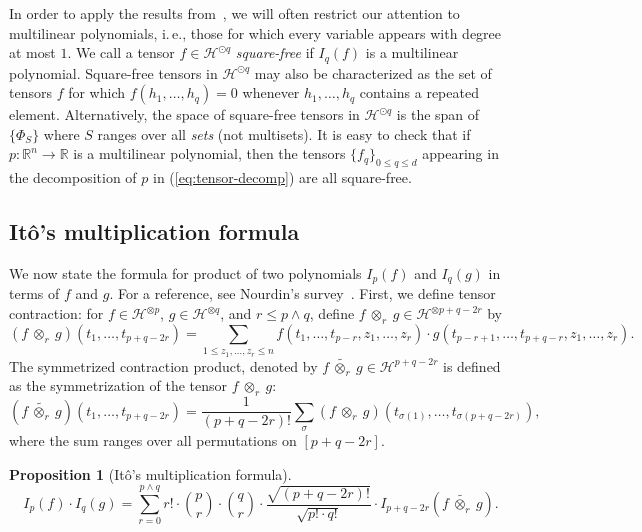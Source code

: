 \documentclass[11pt]{article}
\numberwithin{equation}{section}
\newtheorem{proposition}[theorem]{Proposition}
\theoremstyle{definition}
\theoremstyle{plain}
\newcommand{\ie}{i.\,e.}
\begin{document}
In order to apply the results from~\cite{DS14}, we will often restrict our
attention to multilinear polynomials, \ie, those for which every variable
appears with degree at most $1$. We call a tensor $f \in \mathcal{H}^{\odot q}$
\emph{square-free} if $I_q(f)$ is a multilinear polynomial. Square-free
tensors in $\mathcal{H}^{\odot q}$ may also be characterized as the set of tensors $f$
for which $f(h_1, \dots, h_q) = 0$ whenever $h_1, \dots, h_q$ contains a repeated element.
Alternatively, the space of square-free tensors in $\mathcal{H}^{\odot q}$ is the span
of $\{\Phi_S\}$ where $S$ ranges over all \emph{sets} (not multisets).
It is easy to check that if $p: \mathbb{R}^n \rightarrow \mathbb{R}$ is a multilinear polynomial, 
then the tensors $\{f_q\}_{0 \le q\le d}$ appearing in the decomposition of $p$ in (\ref{eq:tensor-decomp}) are all square-free.

\subsection{It\^{o}'s multiplication formula}

We now state the formula for product of
two polynomials $I_p(f)$ and $I_q(g)$ in terms of $f$ and $g$. For a reference,
see Nourdin's  survey~\cite{Nourdin2013}. First, we define tensor contraction:
for $f \in \mathcal{H}^{\otimes p}$, $g \in \mathcal{H}^{\otimes q}$, and
$r \le p \wedge q$, define $f \ {\otimes}_r \ g \in \mathcal{H}^{\otimes p+q-2r}$ by
\[
    (f\ {\otimes}_r\ g) (t_1, \ldots, t_{p+q-2r})= \sum_{1 \le z_1, \ldots, z_r \le n} f(t_1, \ldots, t_{p-r}, z_{1}, \ldots, z_r) \cdot g(t_{p-r+1}, \ldots, t_{p+q-r}, z_{1}, \ldots, z_r).
\]
The symmetrized contraction product, denoted by $f \ \widetilde{{\otimes}_r} \
g \in \mathcal{H}^{p+q-2r}$ is defined as the symmetrization of the tensor $f \
{\otimes}_r \ g$:
\[
    (f \ \widetilde{\otimes_r} \ g)(t_1, \dots, t_{p+q-2r}) = \frac{1}{(p+q-2r)!} \sum_\sigma (f \ \otimes_r\ g)(t_{\sigma(1)}, \dots, t_{\sigma(p+q-2r)}),
\]
where the sum ranges over all permutations on $[p+q-2r]$.

\begin{proposition}[It\^{o}'s multiplication
    formula]\label{prop:Ito}
\[
I_p(f) \cdot I_q(g) = \sum_{r=0}^{p \wedge q} r! \cdot \binom{p}{r} \cdot \binom{q}{r}  \cdot \frac{\sqrt{(p+q-2r)!}}{\sqrt{p! \cdot q!}}\cdot I_{p+q-2r} (f \ \widetilde{{\otimes}_r} \ g). 
\]
\end{proposition}
\end{document}

